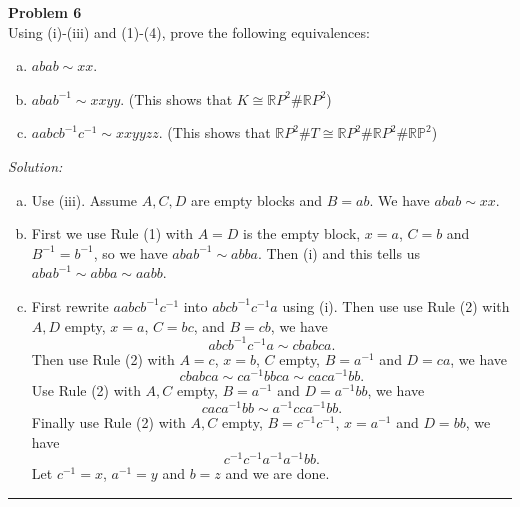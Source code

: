 \documentclass[a4paper, 12pt]{article}
\newenvironment{problem}[2][Problem]
    { \begin{mdframed}[backgroundcolor=gray!20] \textbf{#1 #2} \\}
    {  \end{mdframed}}
\newenvironment{solution}
    {\textit{Solution:}}
    {}
\begin{document}
\begin{problem}{6}
Using (i)-(iii) and (1)-(4), prove the following equivalences:
\begin{enumerate}[(a)]
\item \(abab\sim xx\).
\item \(abab^{-1}\sim xxyy\). (This shows that \(K\cong \mathbb{R}P^2\#\mathbb{R}P^2\))
\item \(aabcb^{-1}c^{-1}\sim xxyyzz\). (This shows that \(\mathbb{R}P^2\# T\cong \mathbb{R}P^2\# \mathbb{R}P^2\# \mathbb{RP}^2\))
\end{enumerate}
\end{problem}
\begin{solution}
\begin{enumerate}[(a)]
\item Use (iii). Assume \(A,C,D\) are empty blocks and \(B=ab\). We have \(abab\sim xx\).
\item First we use Rule (1) with \(A=D\) is the empty block, \(x=a\), \(C=b\) and \(B^{-1}=b^{-1}\), so we have \(abab^{-1}\sim abba\). Then (i) and this tells us \(abab^{-1}\sim abba\sim aabb\).
\item First rewrite \(aabcb^{-1}c^{-1}\) into \(abcb^{-1}c^{-1}a\) using (i). Then use use Rule (2) with \(A,D\) empty, \(x=a\), \(C=bc\), and \(B=cb\), we have 
\[abcb^{-1}c^{-1}a\sim cbabca.\]
Then use Rule (2) with \(A=c\), \(x=b\), \(C\) empty, \(B=a^{-1}\) and \(D=ca\), we have 
\[cbabca\sim ca^{-1}bbca\sim caca^{-1}bb.\]
Use Rule (2) with \(A,C\) empty, \(B=a^{-1}\) and \(D=a^{-1}bb\), we have 
\[caca^{-1}bb\sim a^{-1}cca^{-1}bb.\]
Finally use Rule (2) with \(A,C\) empty, \(B=c^{-1}c^{-1}\), \(x=a^{-1}\) and \(D=bb\), we have 
\[c^{-1}c^{-1}a^{-1}a^{-1}bb.\]
Let \(c^{-1}=x\), \(a^{-1}=y\) and \(b=z\) and we are done.
\end{enumerate}
\end{solution}

\noindent\rule{7in}{2.8pt}
\end{document}
